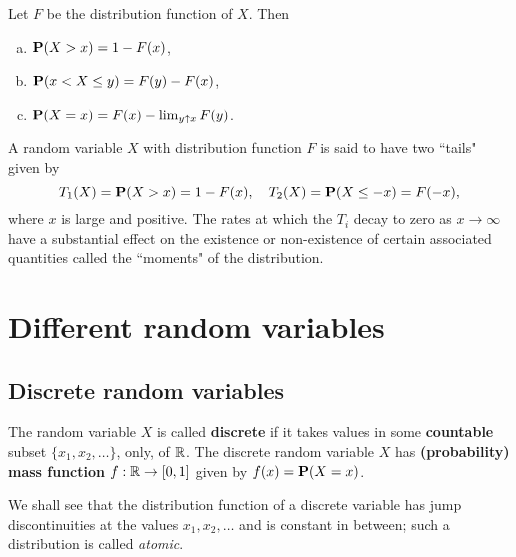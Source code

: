 \begin{lemma}
Let $F$ be the distribution function of $X$. Then
\begin{enumerate}[(a)]
    \item $\mathbf{P}(X>x) = 1-F(x)$, 
    \item $\mathbf{P}(x < X \leq y) = F(y) - F(x)$,
    \item $\mathbf{P}(X = x) = F(x) - \lim_{y \uparrow x} F(y)$.
\end{enumerate}
\end{lemma}

A random variable $X$ with distribution function $F$ is said to have two ``tails" given by 
\begin{equation*}
    T_1 (X) = \mathbf{P}(X > x) = 1 - F(x), \quad T_2(X) = \mathbf{P}(X \leq -x) = F(-x),    
\end{equation*}
where $x$ is large and positive. The rates at which the $T_i$ decay to zero as $x\to\infty$ have a substantial effect on the existence or non-existence of certain associated quantities called the ``moments" of the distribution. 


\section{Different random variables}
\subsection{Discrete random variables}
\begin{definition}
The random variable $X$ is called \textbf{discrete} if it takes values in some \textbf{countable} subset $\{ x_1, x_2, \dots \}$, only, of $\mathbb{R}$. The discrete random variable $X$ has \textbf{(probability) mass function} $f : \mathbb{R} \to [0, 1]$ given by $f(x) = \mathbf{P}(X = x)$. 
\end{definition}
We shall see that the distribution function of a discrete variable has jump discontinuities 
at the values $x_1 , x_2, \dots$ and is constant in between; such a distribution is called \emph{atomic}.

